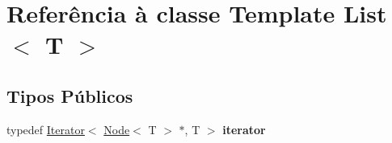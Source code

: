 \hypertarget{classList}{}\section{Referência à classe Template List$<$ T $>$}
\label{classList}
\subsection*{Tipos Públicos}
\begin{DoxyCompactItemize}
\item 
typedef \hyperlink{classIterator}{Iterator}$<$ \hyperlink{classNode}{Node}$<$ T $>$ $\ast$, T $>$ {\bfseries iterator}\hypertarget{classList_ab34bd98c1d755368f65bdbca0d812836}{}\label{classList_ab34bd98c1d755368f65bdbca0d812836}

\end{DoxyCompactItemize}
